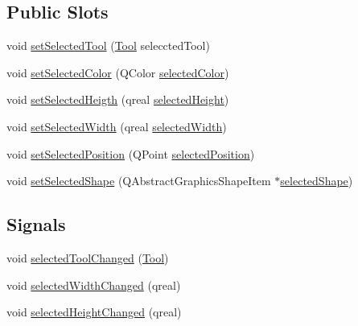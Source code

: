 \subsection*{Public Slots}
\begin{DoxyCompactItemize}
\item 
void \mbox{\hyperlink{classapp_1_1_app_state_a65d839605a7f6926bc2d46534b20ec8c}{set\+Selected\+Tool}} (\mbox{\hyperlink{classapp_1_1_app_state_aa641298e5827611da2512591c4a0e966}{Tool}} seleccted\+Tool)
\item 
void \mbox{\hyperlink{classapp_1_1_app_state_a3e246deb0691d9b0692da546e65c707c}{set\+Selected\+Color}} (Q\+Color \mbox{\hyperlink{classapp_1_1_app_state_a05c87aa8f14b8689902f8aaa363adcc7}{selected\+Color}})
\item 
void \mbox{\hyperlink{classapp_1_1_app_state_ad0d673e923cf52550d08741ccfabbccf}{set\+Selected\+Heigth}} (qreal \mbox{\hyperlink{classapp_1_1_app_state_aaddaf0dbd8c0c99c41968ac6a92709d8}{selected\+Height}})
\item 
void \mbox{\hyperlink{classapp_1_1_app_state_aa7d1b711173cc1ccce7b747d493aa549}{set\+Selected\+Width}} (qreal \mbox{\hyperlink{classapp_1_1_app_state_a31ce013025c446fc7c9f807fe17c0375}{selected\+Width}})
\item 
void \mbox{\hyperlink{classapp_1_1_app_state_a2ce0da74b5c7c3e307f0b55ca6783c58}{set\+Selected\+Position}} (Q\+Point \mbox{\hyperlink{classapp_1_1_app_state_a9fda13b0d9336fc80b2913453694d4c6}{selected\+Position}})
\item 
void \mbox{\hyperlink{classapp_1_1_app_state_a14b1cf39be8be49f16baa526949fd564}{set\+Selected\+Shape}} (Q\+Abstract\+Graphics\+Shape\+Item $\ast$\mbox{\hyperlink{classapp_1_1_app_state_aef0851d3a3c35bb860e43f5dc682d9a7}{selected\+Shape}})
\end{DoxyCompactItemize}
\subsection*{Signals}
\begin{DoxyCompactItemize}
\item 
void \mbox{\hyperlink{classapp_1_1_app_state_a7c4e871a2fece275654f1dfa4b963119}{selected\+Tool\+Changed}} (\mbox{\hyperlink{classapp_1_1_app_state_aa641298e5827611da2512591c4a0e966}{Tool}})
\item 
void \mbox{\hyperlink{classapp_1_1_app_state_afad9c73d20d2ebe623a877eb9558570f}{selected\+Width\+Changed}} (qreal)
\item 
void \mbox{\hyperlink{classapp_1_1_app_state_a7780247f4dc81e62f9a12c6f4c733385}{selected\+Height\+Changed}} (qreal)
\end{DoxyCompactItemize}
